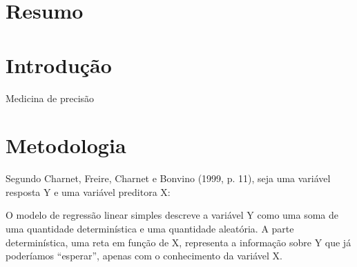 \documentclass[a4paper]{article}
\begin{document}



\section{Resumo}


\section{Introdução}

Medicina de precisão 

\section{Metodologia}

Segundo Charnet, Freire, Charnet e Bonvino (1999, p. 11), seja uma variável resposta Y e uma variável preditora X:
\begin{flushright}
O modelo de regressão linear simples descreve a variável Y como uma soma de uma quantidade determinística e uma quantidade aleatória. A parte 			determinística, uma reta em função de X, representa a informação sobre Y que já poderíamos ``esperar'', apenas com o conhecimento da variável X.\\
\end{flushright}
\end{document}
